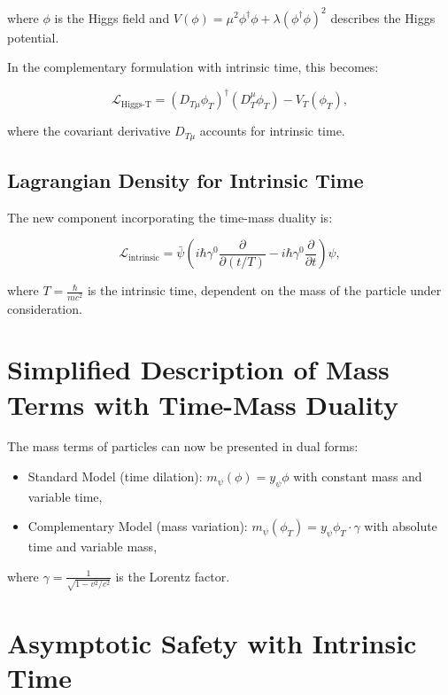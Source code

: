 \documentclass{article}
\begin{document}
where \(\phi\) is the Higgs field and \(V(\phi) = \mu^2 \phi^\dagger \phi + \lambda (\phi^\dagger \phi)^2\) describes the Higgs potential.

In the complementary formulation with intrinsic time, this becomes:

\begin{equation}
	\mathcal{L}_\text{Higgs-T} = (D_{T\mu} \phi_T)^\dagger (D_T^\mu \phi_T) - V_T(\phi_T),
\end{equation}

where the covariant derivative \(D_{T\mu}\) accounts for intrinsic time.

\subsection{Lagrangian Density for Intrinsic Time}
The new component incorporating the time-mass duality is:

\begin{equation}
	\mathcal{L}_\text{intrinsic} = \bar{\psi}\left(i\hbar\gamma^0 \frac{\partial}{\partial (t/T)} - i\hbar\gamma^0 \frac{\partial}{\partial t}\right)\psi,
\end{equation}

where \(T = \frac{\hbar}{mc^2}\) is the intrinsic time, dependent on the mass of the particle under consideration.

\section{Simplified Description of Mass Terms with Time-Mass Duality}

The mass terms of particles can now be presented in dual forms:

\begin{itemize}
	\item Standard Model (time dilation): \(m_\psi(\phi) = y_\psi \phi\) with constant mass and variable time,
	\item Complementary Model (mass variation): \(m_\psi(\phi_T) = y_\psi \phi_T \cdot \gamma\) with absolute time and variable mass,
\end{itemize}

where \(\gamma = \frac{1}{\sqrt{1-v^2/c^2}}\) is the Lorentz factor.

\section{Asymptotic Safety with Intrinsic Time}
\end{document}

